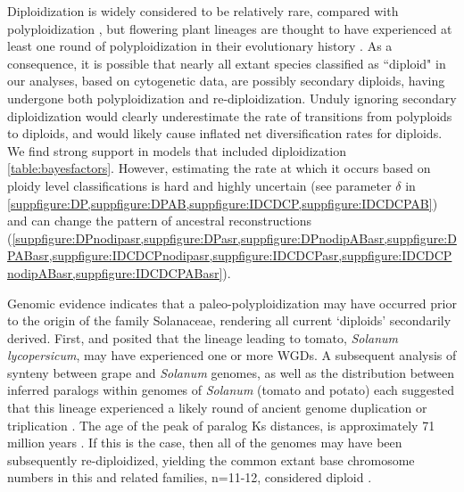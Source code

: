
Diploidization is widely considered to be relatively rare, compared with polyploidization \citep{husband_2013}, but flowering plant lineages are thought to have experienced at least one round of polyploidization in their evolutionary history \citep{soltis_2015}.
As a consequence, it is possible that nearly all extant species classified as ``diploid" in our analyses, based on cytogenetic data, are possibly secondary diploids, having undergone both polyploidization and re-diploidization.
Unduly ignoring secondary diploidization would clearly underestimate the rate of transitions from polyploids to diploids, and would likely cause inflated net diversification rates for diploids. %
We find strong support in models that included diploidization \cref{table:bayesfactors}. However, estimating the rate at which it occurs based on ploidy level classifications is hard and highly uncertain (see parameter $\delta$ in \cref{suppfigure:DP,suppfigure:DPAB,suppfigure:IDCDCP,suppfigure:IDCDCPAB}) and can change the pattern of ancestral reconstructions (\cref{suppfigure:DPnodipasr,suppfigure:DPasr,suppfigure:DPnodipABasr,suppfigure:DPABasr,suppfigure:IDCDCPnodipasr,suppfigure:IDCDCPasr,suppfigure:IDCDCPnodipABasr,suppfigure:IDCDCPABasr}).

Genomic evidence indicates that a paleo-polyploidization may have occurred prior to the origin of the family Solanaceae, rendering all current `diploids' secondarily derived. 
First, \citet{ku2000} and \citet{blanc2004} posited that the lineage leading to tomato, \textit{Solanum lycopersicum}, may have experienced one or more WGDs.
A subsequent analysis of synteny between grape and \textit{Solanum} genomes, as well as the distribution between inferred paralogs within genomes of \textit{Solanum} (tomato and potato) each suggested that this lineage experienced a likely round of ancient genome duplication or triplication \citep{tomato2012}. 
The age of the peak of paralog Ks distances, is approximately 71 million years \citep{tomato2012}. 
If this is the case, then all of the genomes may have been subsequently re-diploidized, yielding the common extant base chromosome numbers in this and related families, n=11-12, considered diploid \citep{robertson_2011}. 

